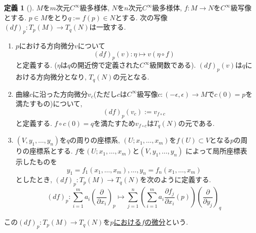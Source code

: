 \documentclass[dvipdfmx,a4paper,11pt]{article}
\theoremstyle{definition}
\newtheorem{dfn}[thm]{定義}
\newcommand{\pdrv}[2]{\frac{\partial #1}{\partial #2}}
\begin{document}
\begin{tcolorbox}[
    colback = white,
    colframe = green!35!black,
    fonttitle = \bfseries,
    breakable = true]
    \begin{dfn}[]
    \label{differential}
    $M$を$m$次元$C^{\infty}$級多様体, $N$を$n$次元$C^{\infty}$級多様体, $f: M \rightarrow N$を$C^{\infty}$級写像とする. 
    $p \in M$をとり$q := f(p) \in N$とする.
    次の写像$(df)_{p} : T_{p}(M) \rightarrow T_{q}(N)$は一致する.
     \begin{enumerate}
              \setlength{\parskip}{0cm}
  \setlength{\itemsep}{2pt} 
     \item $p$における方向微分$v$について
     $$
    (df)_{p}(v)  : \eta \mapsto  v(\eta \circ f)
     $$
     と定義する. ($\eta$は$q$の開近傍で定義された$C^{\infty}$級関数である).
     $ (df)_{p}(v) $は$q$における方向微分となり, $T_{q}(N)$の元となる.
     \item 曲線$c$に沿った方向微分$v_{c}$(ただし$c$は$C^{\infty}$級写像$c : (-\epsilon, \epsilon) \rightarrow M$で$c(0)=p$を満たすもの)について, 
     $$
     (df)_{p}(v_c) := v_{f \circ c}
     $$
     と定義する. $f\circ c(0) =q$を満たすため$v_{f \circ c}$は$T_{q}(N)$の元である.
     \item $(V, y_1, \ldots, y_n)$を$q$の周りの座標系, $(U; x_1, \ldots, x_m)$を$f(U) \subset V$となる$p$の周りの座標系とする.
         $f$を$(U; x_1, \ldots, x_m)$と$(V, y_1, \ldots, y_n)$ によって局所座標表示したものを
$$y_1=f_1(x_1, \ldots, x_m), \ldots, y_n=f_n(x_1, \ldots, x_m)$$
としたとき, $(df)_{p} : T_{p}(M) \rightarrow T_{q}(N)$を次のように定義する.
$$ (df)_{p} : \sum_{i=1}^{m} a_i \left(\pdrv{}{x_i}\right)_{p}  \mapsto 
\sum_{j=1}^{n} \left(\sum_{i=1}^{m} a_i  \pdrv{f_{j}}{x_i}(p) \right)  \left(\pdrv{}{y_j}\right)_{q} $$
     \end{enumerate}
     
     
この$(d f)_{p} : T_{p}(M) \rightarrow T_{q}(N)$を\underline{$p$における$f$の微分}という.
    \end{dfn}
    \end{tcolorbox} 
    
\end{document}
